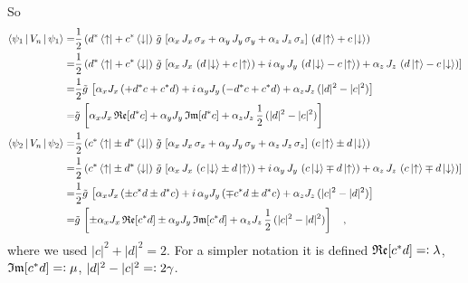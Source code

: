 \documentclass{article}
\begin{document}
So
\begin{align*}
      \Braket{\psi_{1}| V_n| \psi_{1}}=&\half\left(d^*\bra{\uparrow}+ c^*\bra{\downarrow}\right) \,\tilde{g}\,\left[\alpha_x\,J_x\,\sigma_x+\alpha_y\,J_y\,\sigma_y+\alpha_z\,J_z\,\sigma_z\right] \,\left(d\ket{\uparrow}+ c\ket{\downarrow}\right)\\
    =&\half\left(d^*\bra{\uparrow}+c^*\bra{\downarrow}\right) \,\tilde{g}\,\left[\alpha_x\,J_x\,\left(d\ket{\downarrow}+c\ket{\uparrow}\right)+i\,\alpha_y\,J_y\,\left(d\ket{\downarrow}-c\ket{\uparrow}\right)+\alpha_z\,J_z\,\left(d\ket{\uparrow}-c\ket{\downarrow}\right)\right]\\
    =&\half\tilde{g}\,\left[\alpha_xJ_x\,(+ d^*c+ c^*d ) + i\,\alpha_yJ_y\,(- d^*c+ c^*d) + \alpha_zJ_z\,(|d|^2-|c|^2)\right]\\
    =&\tilde{g}\,\left[\alpha_xJ_x\,\mathfrak{Re} [d^*c] + \alpha_yJ_y\,\mathfrak{Im} [d^*c] + \alpha_zJ_z\,\half\,(|d|^2-|c|^2)\right]\\
%
    \Braket{\psi_{2}| V_n| \psi_{2}}=&\half\left(c^*\bra{\uparrow}\pm d^*\bra{\downarrow}\right) \,\tilde{g}\,\left[\alpha_x\,J_x\,\sigma_x+\alpha_y\,J_y\,\sigma_y+\alpha_z\,J_z\,\sigma_z\right] \,\left(c\ket{\uparrow}\pm d\ket{\downarrow}\right)\\
    =&\half\left(c^*\bra{\uparrow}\pm d^*\bra{\downarrow}\right) \,\tilde{g}\,\left[\alpha_x\,J_x\,\left(c\ket{\downarrow}\pm d\ket{\uparrow}\right)+i\,\alpha_y\,J_y\,\left(c\ket{\downarrow}\mp d\ket{\uparrow}\right)+\alpha_z\,J_z\,\left(c\ket{\uparrow}\mp d\ket{\downarrow}\right)\right]\\
    =&\half\tilde{g}\,\left[\alpha_xJ_x\,(\pm c^*d\pm d^*c ) + i\,\alpha_yJ_y\,(\mp c^*d\pm d^*c) + \alpha_zJ_z\,(|c|^2-|d|^2)\right]\\
    =&\tilde{g}\,\left[\pm\alpha_xJ_x\,\mathfrak{Re} [c^*d] \pm \alpha_yJ_y\,\mathfrak{Im} [c^*d] + \alpha_zJ_z\,\half\,(|c|^2-|d|^2)\right]\quad,
\end{align*}
where we used $|c|^2+|d|^2=2$. For a simpler notation it is defined $\mathfrak{Re} [c^*d]=\vcentcolon\lambda$, $\mathfrak{Im} [c^*d]=\vcentcolon\mu$, $|d|^2-|c|^2=\vcentcolon2\gamma$.
\end{document}

